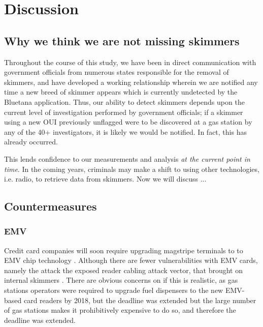 \section{Discussion}
\label{sec:discussion}

\subsection{Why we think we are not missing skimmers} %

Throughout the course of this study, we have been in direct communication with government officials from numerous states
responsible for the removal of skimmers, and have developed a working relationship wherein we are notified any time
a new breed of skimmer appears which is currently undetected by the Bluetana application.
%
Thus, our ability to detect skimmers depends upon the current level of investigation performed by government officials;
%
if a skimmer using a new OUI previously unflagged were to be discovered at a gas station by any of the 40+
investigators, it is likely we would be notified.
%
In fact, this has already occurred.

This lends confidence to our measurements and analysis \textit{at the current point in time}.
%
In the coming years, criminals may make a shift to using other technologies, i.e. radio, to retrieve data from
skimmers.
%
Now we will discuss ...

\subsection{Countermeasures} %

\subsubsection{EMV}
\label{sec:discussion:emv}

Credit card companies will soon require upgrading magstripe terminals to to EMV
chip technology .
%
Although there are fewer vulnerabilities with EMV cards, namely the attack the
exposed reader cabling attack vector, that brought on internal skimmers
.
%
There are obvious concerns on if this is realistic, as gas stations operators
were required to upgrade fuel dispensers to the new EMV-based card readers by
2018, but the deadline was extended but the large number of gas stations makes
it prohibitively expensive to do so, and therefore the deadline was extended.

